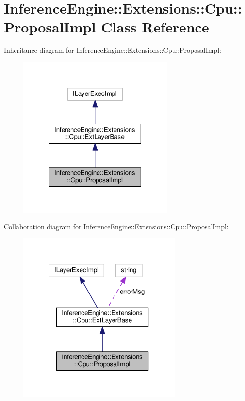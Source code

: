 \hypertarget{classInferenceEngine_1_1Extensions_1_1Cpu_1_1ProposalImpl}{}\section{Inference\+Engine\+:\+:Extensions\+:\+:Cpu\+:\+:Proposal\+Impl Class Reference}
\label{classInferenceEngine_1_1Extensions_1_1Cpu_1_1ProposalImpl}


Inheritance diagram for Inference\+Engine\+:\+:Extensions\+:\+:Cpu\+:\+:Proposal\+Impl\+:
\nopagebreak
\begin{figure}[H]
\begin{center}
\leavevmode
\includegraphics[width=222pt]{classInferenceEngine_1_1Extensions_1_1Cpu_1_1ProposalImpl__inherit__graph}
\end{center}
\end{figure}


Collaboration diagram for Inference\+Engine\+:\+:Extensions\+:\+:Cpu\+:\+:Proposal\+Impl\+:
\nopagebreak
\begin{figure}[H]
\begin{center}
\leavevmode
\includegraphics[width=234pt]{classInferenceEngine_1_1Extensions_1_1Cpu_1_1ProposalImpl__coll__graph}
\end{center}
\end{figure}
